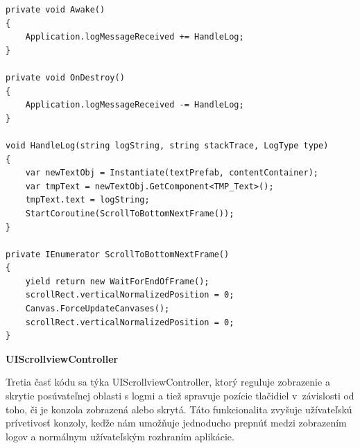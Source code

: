 \lstset{style=Csharp}
\begin{lstlisting}[caption={DebugUI Class - Kontrolér pre vizuálne zobrazenie logov}, label=debugUi]
private void Awake()
{
    Application.logMessageReceived += HandleLog;
}

private void OnDestroy()
{
    Application.logMessageReceived -= HandleLog;
}

void HandleLog(string logString, string stackTrace, LogType type)
{
    var newTextObj = Instantiate(textPrefab, contentContainer);
    var tmpText = newTextObj.GetComponent<TMP_Text>();
    tmpText.text = logString;
    StartCoroutine(ScrollToBottomNextFrame());
}

private IEnumerator ScrollToBottomNextFrame()
{
    yield return new WaitForEndOfFrame();
    scrollRect.verticalNormalizedPosition = 0;
    Canvas.ForceUpdateCanvases();
    scrollRect.verticalNormalizedPosition = 0;
}
\end{lstlisting} 

{\normalsize\textbf{UIScrollviewController}}

Tretia časť kódu sa týka UIScrollviewController, ktorý reguluje zobrazenie a skrytie posúvateľnej oblasti s logmi a tiež spravuje pozície tlačidiel v~závislosti od toho, či je konzola zobrazená alebo skrytá. Táto funkcionalita zvyšuje užívateľskú prívetivosť konzoly, keďže nám umožňuje jednoducho prepnúť medzi zobrazením logov a normálnym užívateľským rozhraním aplikácie.

